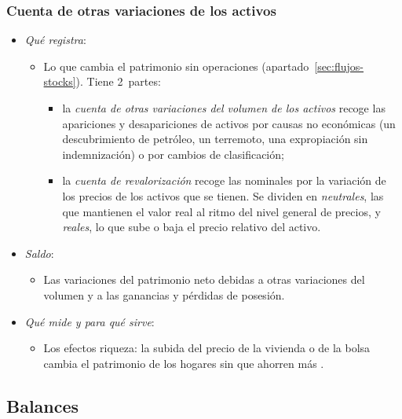 \documentclass[11pt]{article}
\begin{document}
\subsubsection{Cuenta de otras variaciones de los activos}\label{sec:otras-variaciones}

\begin{itemize}
\item \emph{Qué registra}:
  \begin{itemize}
  \item Lo que cambia el patrimonio sin operaciones (apartado~\ref{sec:flujos-stocks}). Tiene 2~partes:
    \begin{itemize}
    \item la \emph{cuenta de otras variaciones del volumen de los activos} recoge las apariciones y desapariciones de activos por causas no económicas (un descubrimiento de petróleo, un terremoto, una expropiación sin indemnización) o por cambios de clasificación;
    \item la \emph{cuenta de revalorización} recoge las  nominales por la variación de los precios de los activos que se tienen. Se dividen en \emph{neutrales}, las que mantienen el valor real al ritmo del nivel general de precios, y \emph{reales}, lo que sube o baja el precio relativo del activo.
    \end{itemize}
  \end{itemize}
\item \emph{Saldo}:
  \begin{itemize}
  \item Las variaciones del patrimonio neto debidas a otras variaciones del volumen y a las ganancias y pérdidas de posesión.
  \end{itemize}
\item \emph{Qué mide y para qué sirve}:
  \begin{itemize}
  \item Los efectos riqueza: la subida del precio de la vivienda o de la bolsa cambia el patrimonio de los hogares sin que ahorren más .
  \end{itemize}
\end{itemize}

\subsection{Balances}\label{sec:balances}
\end{document}
